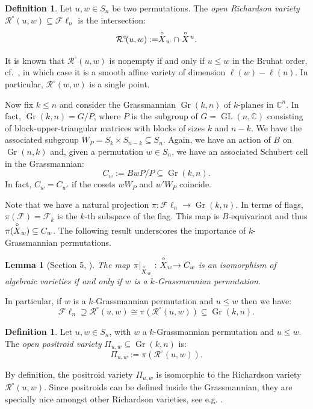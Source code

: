 \documentclass[10pt]{amsart}
\theoremstyle{plain}
\newtheorem{lemma}[thm]{Lemma}
\theoremstyle{definition}
\newtheorem{definition}[thm]{Definition}
\theoremstyle{remark}
\numberwithin{equation}{section}
\newcommand{\C}{\mathbb{C}}
\newcommand{\GL}{\operatorname{GL}}
\renewcommand{\C}{\mathbb{C}}
\newcommand{\cF}{\mathscr{F}}
\newcommand{\Fl}{\mathscr{F}\ell}
\newcommand{\schub}{\buildrel\circ \over X}
\newcommand{\rich}[2]{\mathcal{R}^{\circ}\!(#2,#1)}
\DeclareMathOperator{\Gr}{Gr}
\begin{document}
\begin{definition}
Let $u, w \in S_n$ be two permutations. The \emph{open Richardson variety} $\rich{w}{u} \subseteq \Fl_{n}$ is the intersection:
\[
\rich{w}{u} := \schub_{w} \cap \schub\!^{u}.
\]
\end{definition}

\noindent It is known that $\rich{w}{u}$ is nonempty if and only if $u \leq w$ in the Bruhat order, cf.~\cite{SpeyerSurvey}, in which case it is a smooth affine variety of dimension $\ell(w) - \ell(u)$. In particular, $\rich{w}{w}$ is a single point.

Now fix $k \leq n$ and consider the Grassmannian $\Gr(k,n)$ of $k$-planes in $\C^{n}$. In fact, $\Gr(k,n) = G/P$, where $P$ is the subgroup of $G = \GL(n,\C)$ consisting of block-upper-triangular matrices with blocks of sizes $k$ and $n-k$. We have the associated subgroup $W_P = S_k \times S_{n-k} \subseteq S_n$. Again, we have an action of $B$ on $\Gr(n,k)$ and, given a permutation $w \in S_n$, we have an associated Schubert cell in the Grassmannian:
\[
C_{w} := BwP/P \subseteq \Gr(k,n).
\]
In fact, $C_{w} = C_{w'}$ if the cosets $wW_{P}$ and $w'W_{P}$ coincide.

Note that we have a natural projection $\pi: \Fl_n \to \Gr(k,n)$. In terms of flags, $\pi(\cF) = \cF_{k}$ is the $k$-th subspace of the flag. This map is $B$-equivariant and thus $\pi(\schub_{w}) \subseteq C_{w}$. The following result underscores the importance of $k$-Grassmannian permutations. 

\begin{lemma}[Section 5, \cite{KLS}]\label{lem: projection schubert}
The map $\pi|_{\schub_{w}}: \,\, \schub_{w} \to C_w$ is an isomorphism of algebraic varieties if and only if $w$ is a $k$-Grassmannian permutation. 
\end{lemma}

In particular, if $w$ is a $k$-Grassmannian permutation and $u \leq w$ then we have:
\[
\Fl_{n} \supseteq \rich{w}{u} \cong \pi(\rich{w}{u}) \subseteq \Gr(k,n).
\]

\begin{definition}
    Let $u, w \in S_n$, with $w$ a $k$-Grassmannian permutation and $u \leq w$. The \emph{open positroid variety} $\Pi_{u, w} \subseteq \Gr(k,n)$ is:
    \[
    \Pi_{u, w} := \pi(\rich{w}{u}). 
    \]
\end{definition}

By definition, the positroid variety $\Pi_{u, w}$ is isomorphic to the Richardson variety $\rich{w}{u}$. Since positroids can be defined inside the Grassmannian, they are specially nice amongst other Richardson varieties, see e.g. \cite{GL, KLS, KLS2, SpeyerSurvey}.  
\end{document}
